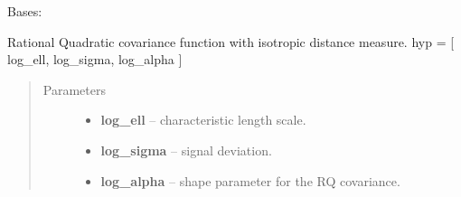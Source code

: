\documentclass[letterpaper,10pt,english]{sphinxmanual}
\begin{document}
\begin{fulllineitems}
\label{pyGPs.Core:pyGPs.Core.cov.RQ}
Bases: {\hyperref[pyGPs.Core:pyGPs.Core.cov.Kernel]{}}

Rational Quadratic covariance function with isotropic distance measure.
hyp = {[} log\_ell, log\_sigma, log\_alpha {]}
\begin{quote}\begin{description}
\item[{Parameters}] \leavevmode\begin{itemize}
\item {} 
\textbf{log\_ell} -- characteristic length scale.

\item {} 
\textbf{log\_sigma} -- signal deviation.

\item {} 
\textbf{log\_alpha} -- shape parameter for the RQ covariance.

\end{itemize}

\end{description}\end{quote}

\begin{fulllineitems}
\label{pyGPs.Core:pyGPs.Core.cov.RQ.getCovMatrix}
\end{fulllineitems}


\begin{fulllineitems}
\label{pyGPs.Core:pyGPs.Core.cov.RQ.getDerMatrix}
\end{fulllineitems}


\end{fulllineitems}

\end{document}

